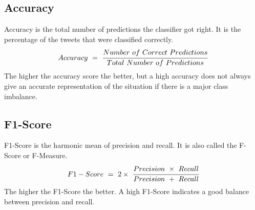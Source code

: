 \subsection{Accuracy}
Accuracy is the total number of predictions the classifier got right. It is the percentage of the tweets that were classified correctly.
\begin{equation}
    Accuracy\ =\ \cfrac{Number\ of\ Correct\ Predictions}{Total\ Number\ of\ Predictions}
\end{equation}
The higher the accuracy score the better, but a high accuracy does not always give an accurate representation of the situation if there is a major class imbalance.

\subsection{F1-Score}
F1-Score is the harmonic mean of precision and recall. It is also called the F-Score or F-Measure. 
\begin{equation}
    F1-Score\ =\ 2 \times\ \cfrac{Precision\ \times\ Recall}{Precision\ +\ Recall}
\end{equation}
The higher the F1-Score the better. A high F1-Score indicates a good balance between precision and recall.

